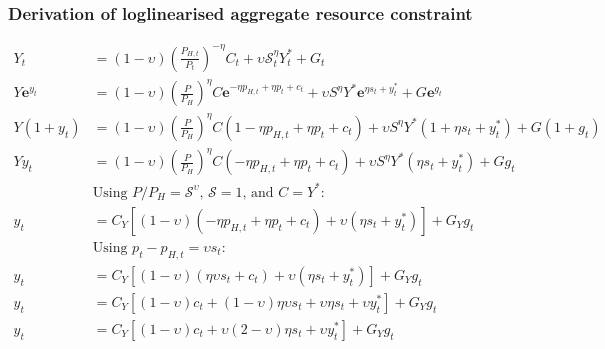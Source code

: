 \subsubsection*{Derivation of loglinearised aggregate resource constraint}
\begin{align}\label{eq:appendix_log_rc_beginning}
    Y_t &= (1-\upsilon)\left(\frac{P_{H,t}}{P_t}\right)^{-\eta}C_t + \upsilon \mathcal{S}_t^{\eta}Y_t^* + G_t\\
    Y \mathbf{e}^{y_t} &= (1-\upsilon)\left(\frac{P}{P_{H}}\right)^{\eta}C \mathbf{e}^{-\eta p_{H,t} + \eta p_t + c_t}+ \upsilon S^{\eta} Y^* \mathbf{e}^{\eta s_t + y^*_t} + G \mathbf{e}^{g_t}\\
    Y ({1+y_t}) &= (1-\upsilon)\left(\frac{P}{P_{H}}\right)^{\eta}C ({1 -\eta p_{H,t} + \eta p_t + c_t})+ \upsilon S^{\eta} Y^* ({1 + \eta s_t + y^*_t}) + G ({1+ g_t})\\
    Y y_t &= (1-\upsilon)\left(\frac{P}{P_{H}}\right)^{\eta}C ({-\eta p_{H,t} + \eta p_t + c_t})+ \upsilon S^{\eta} Y^* ({\eta s_t + y^*_t}) + G g_t\\
    &\text{Using $P/P_H = \mathcal{S}^\upsilon$, $\mathcal{S} = 1$, and $C=Y^*$}:\nonumber\\
    y_t &= C_Y\left[(1-\upsilon)({-\eta p_{H,t} + \eta p_t + c_t})+ \upsilon ({\eta s_t + y^*_t})\right] + G_Y g_t\\
    &\text{Using $p_t - p_{H,t} = \upsilon s_t$}:\nonumber\\
    y_t &= C_Y\left[(1-\upsilon)({\eta \upsilon s_t + c_t})+ \upsilon ({\eta s_t + y^*_t})\right] + G_Y g_t\\
    y_t &= C_Y\left[(1-\upsilon)c_t + (1-\upsilon) \eta \upsilon s_t + \upsilon {\eta s_t} + \upsilon y^*_t\right] + G_Y g_t\\
    y_t &= C_Y\left[(1-\upsilon)c_t + \upsilon (2-\upsilon)\eta s_t + \upsilon y^*_t\right] + G_Y g_t \label{eq:appendix_log_rc_end}
\end{align}
\newpage